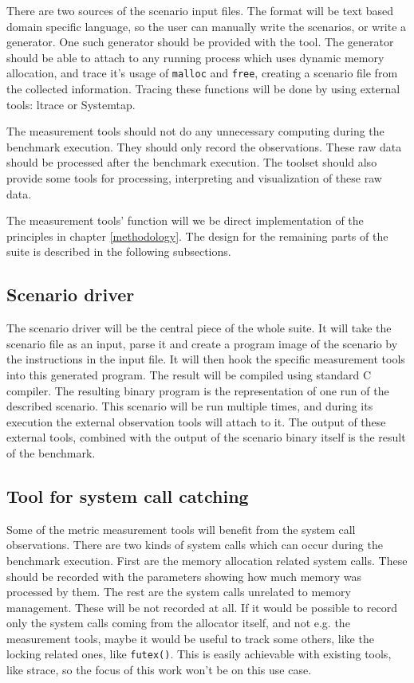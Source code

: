 There are two sources of the scenario input files. The format will be text based domain specific language, so the user can manually write the scenarios, or write a generator. One such generator should be provided with the tool. The generator should be able to attach to any running process which uses dynamic memory allocation, and trace it's usage of {\tt malloc} and {\tt free}, creating a scenario file from the collected information. Tracing these functions will be done by using external tools: ltrace or Systemtap.

The measurement tools should not do any unnecessary computing during the benchmark execution. They should only record the observations. These raw data should be processed after the benchmark execution. The toolset should also provide some tools for processing, interpreting and visualization of these raw data.

The measurement tools' function will we be direct implementation of the principles in chapter \ref{methodology}. The design for the remaining parts of the suite is described in the following subsections.

\subsection{Scenario driver}

The scenario driver will be the central piece of the whole suite. It will take the scenario file as an input, parse it and create a program image of the scenario by the instructions in the input file. It will then hook the specific measurement tools into this generated program. The result will be compiled using standard C compiler. The resulting binary program is the representation of one run of the described scenario. This scenario will be run multiple times, and during its execution the external observation tools will attach to it. The output of these external tools, combined with the output of the scenario binary itself is the result of the benchmark.

\subsection{Tool for system call catching}

Some of the metric measurement tools will benefit from the system call observations. There are two kinds of system calls which can occur during the benchmark execution. First are the memory allocation related system calls. These should be recorded with the parameters showing how much memory was processed by them. The rest are the system calls unrelated to memory management. These will be not recorded at all. If it would be possible to record only the system calls coming from the allocator itself, and not e.g. the measurement tools, maybe it would be useful to track some others, like the locking related ones, like {\tt futex()}. This is easily achievable with existing tools, like strace, so the focus of this work won't be on this use case.

